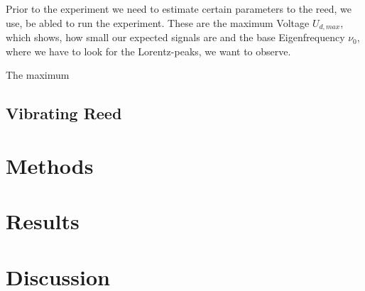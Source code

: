 \documentclass[twoside, a4paper, DIV=11,twocolumn, 12pt]{book}
\begin{document}
Prior to the experiment we need to estimate certain parameters to the reed, we use, be abled to run the experiment. These are the maximum Voltage $U_{d,max}$, which shows, 
how small our expected signals are and the base Eigenfrequency $\nu_0$, where we have to look for the Lorentz-peaks, we want to observe.


The maximum


\section{Vibrating Reed}
\label{sec:reed}

\chapter{Methods}
\label{sec:meth}


\chapter{Results}
\label{sec:res}

\chapter{Discussion}
\label{sec:disk}

\end{document}
